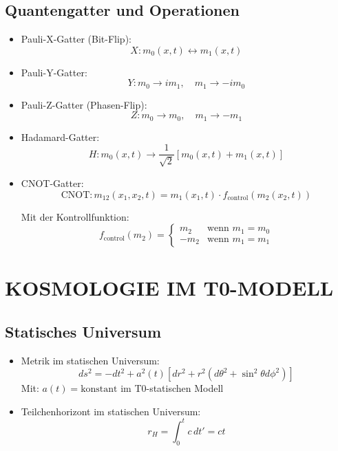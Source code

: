 \documentclass[12pt,a4paper]{article}
\begin{document}
	\subsection{Quantengatter und Operationen}
	\begin{itemize}
		\item Pauli-X-Gatter (Bit-Flip):
		\begin{equation}
			X: m_0(x,t) \leftrightarrow m_1(x,t)
		\end{equation}
		
		\item Pauli-Y-Gatter:
		\begin{equation}
			Y: m_0 \rightarrow im_1, \quad m_1 \rightarrow -im_0
		\end{equation}
		
		\item Pauli-Z-Gatter (Phasen-Flip):
		\begin{equation}
			Z: m_0 \rightarrow m_0, \quad m_1 \rightarrow -m_1
		\end{equation}
		
		\item Hadamard-Gatter:
		\begin{equation}
			H: m_0(x,t) \rightarrow \frac{1}{\sqrt{2}}[m_0(x,t) + m_1(x,t)]
		\end{equation}
		
		\item CNOT-Gatter:
		\begin{equation}
			\text{CNOT}: m_{12}(x_1,x_2,t) = m_1(x_1,t) \cdot f_{\text{control}}(m_2(x_2,t))
		\end{equation}
		
		Mit der Kontrollfunktion:
		\begin{equation}
			f_{\text{control}}(m_2) = 
			\begin{cases}
				m_2 & \text{wenn } m_1 = m_0 \\
				-m_2 & \text{wenn } m_1 = m_1
			\end{cases}
		\end{equation}
	\end{itemize}
	
	\section{KOSMOLOGIE IM T0-MODELL}
	
	\subsection{Statisches Universum}
	\begin{itemize}
		\item Metrik im statischen Universum:
		\begin{equation}
			ds^2 = -dt^2 + a^2(t)[dr^2 + r^2(d\theta^2 + \sin^2\theta d\phi^2)]
		\end{equation}
		Mit: $a(t) = \text{konstant}$ im T0-statischen Modell
		
		\item Teilchenhorizont im statischen Universum:
		\begin{equation}
			r_H = \int_0^t c \, dt' = ct
		\end{equation}
	\end{itemize}
	
\end{document}
